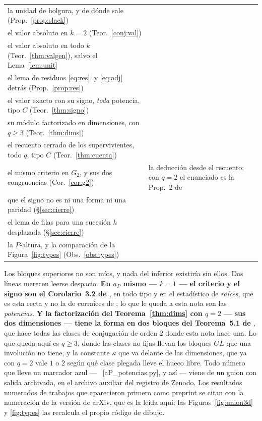 \documentclass[11pt,a4paper]{article}
\newcommand{\ver}[1]{\unskip\penalty0\ \textcolor{azul}{\small\textsf{[#1]}}}
\begin{document}
{\begin{longtable}{@{}p{}p{}@{}}
la unidad de holgura, y de dónde sale (Prop.~\ref{prop:slack}) & \\
el valor absoluto en $k=2$ (Teor.~\ref{conj:val}) & \\
el valor absoluto en todo $k$ (Teor.~\ref{thm:valgen}), salvo el Lema~\ref{lem:unit} & \\
el lema de residuos \eqref{eq:res}, y \eqref{eq:adj} detrás (Prop.~\ref{prop:res}) & \\
el valor exacto con su signo, \emph{toda} potencia, tipo $C$ (Teor.~\ref{thm:signo}) & \\
su módulo factorizado en dimensiones, con $q\ge3$ (Teor.~\ref{thm:dims}) & \\
el recuento cerrado de los supervivientes, todo $q$, tipo $C$ (Teor.~\ref{thm:cuenta}) & \\
el mismo criterio en $G_2$, y sus dos congruencias (Cor.~\ref{cor:g2}) & la deducción desde el recuento; con $q=2$ el enunciado es la Prop.~2 de \cite{Kar24}\\
que el signo no es ni una forma ni una paridad (\S\ref{sec:cierre}) & \\
el lema de filas para una sucesión $h$ desplazada (\S\ref{sec:cierre}) & \\
la $P$-altura, y la comparación de la Figura~\ref{fig:types} (Obs.~\ref{obs:types}) & \\
\bottomrule
\end{longtable}}

\vspace{3pt}
\noindent Los bloques superiores no son míos, y nada del inferior existiría sin ellos. Dos líneas
merecen leerse despacio. \textbf{En $a_P$ mismo --- $k=1$ --- el criterio y el signo son el
Corolario~3.2 de \cite{CMP06}}, en todo tipo y en el estadístico de \emph{raíces}, que es esta
recta y no la de corraíces de \cite{NPP25}; lo que le queda a esta nota son las \emph{potencias}.
\textbf{Y la factorización del Teorema~\ref{thm:dims} con $q=2$ --- sus dos dimensiones ---
tiene la forma en dos bloques del Teorema~5.1 de \cite{Kar24}}, que hace todas las clases de conjugación de orden $2$ donde
esta nota hace una. Lo que queda aquí es $q\ge3$, donde las clases no fijas llevan los bloques
$GL$ que una involución no tiene, y la constante $\kappa$ que va delante de las dimensiones, que
ya con $q=2$ vale $1$ o $2$ según qué clase plegada lleve el hueco libre. Todo número que
lleve un marcador azul --- \ver{aP\_potencias.py}, y así --- viene de un guion con salida
archivada, en el archivo auxiliar del registro de Zenodo. Los resultados numerados de trabajos que aparecieron primero como
preprint se citan con la numeración de la versión de arXiv, que es la leída aquí;
las Figuras~\ref{fig:union3d} y \ref{fig:types} las recalcula el
propio código de dibujo.
\end{document}
